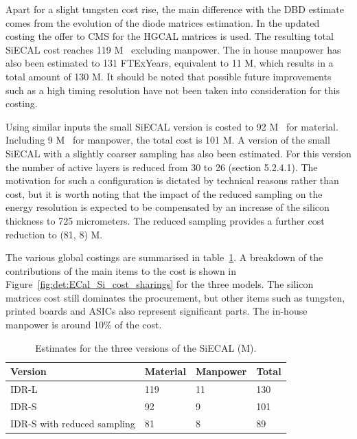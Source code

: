 Apart for a slight tungsten cost rise, the main difference with the DBD estimate comes from the evolution of the diode matrices estimation. In the updated costing the offer to CMS for the HGCAL matrices is used. The resulting total SiECAL cost reaches 119 M\texteuro~ excluding manpower. The in house manpower has also been estimated to 131 FTExYears, equivalent to 11 M\texteuro, which results in a total amount of 130 M\texteuro. It should be noted that possible future improvements such as a high timing resolution have not been taken into consideration for this costing.

Using similar inputs the small SiECAL version is costed to 92 M\texteuro~ for material. Including 9 M\texteuro~ for manpower, the total cost is 101 M\texteuro. 
A version of the small SiECAL with a slightly coarser sampling has also been estimated. For this version the number of active layers is reduced from 30 to 26 (section 5.2.4.1). The motivation for such a configuration is dictated by technical reasons rather than cost, but it is worth noting that the impact of the reduced sampling on the energy resolution is expected to be compensated by an increase of the silicon thickness to 725 micrometers. The reduced sampling provides a further cost reduction to (81, 8) M\texteuro.  

The various global costings are summarised in table~\ref{ECal_summary}. A breakdown of the contributions of the main items to the cost is shown in Figure~\ref{fig:det:ECal_Si_cost_sharings} for the three models. The silicon matrices cost still dominates the procurement, but other items such as tungsten, printed boards and ASICs also represent significant parts. The in-house manpower is around 10\% of the cost.

\begin{table}\hspace*{-0cm}\small 
\begin{tabular}[h!]{ l p{0.2\hsize}p{0.2\hsize}p{0.2\hsize} }
\toprule
Version& Material & Manpower & Total \\
\midrule
IDR-L                       & 119   & 11    & 130   \\
IDR-S                       & 92    &  9    & 101   \\
IDR-S with reduced sampling & 81    &  8    & 89  \\
\bottomrule
\end{tabular}
\caption{\label{ECal_summary}Estimates for the three versions of the SiECAL (M\texteuro).}
\end{table}

